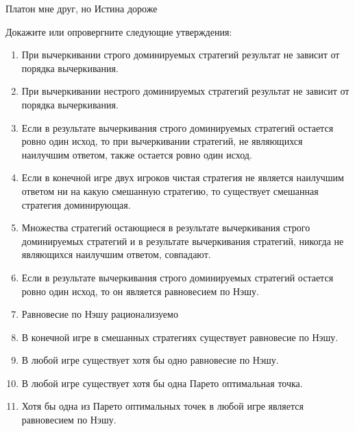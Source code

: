 \begin{problem}
 Платон мне друг, но Истина дороже\par
Докажите или опровергните следующие утверждения:\par
\begin{enumerate}
\item	При вычеркивании строго доминируемых стратегий результат не зависит от порядка вычеркивания.\par
\item 	При вычеркивании нестрого доминируемых стратегий результат не зависит от порядка вычеркивания.\par
\item 	Если в результате вычеркивания строго доминируемых стратегий остается ровно один исход, то при вычеркивании стратегий, не являющихся наилучшим ответом, также остается ровно один исход.\par
\item Если в конечной игре двух игроков чистая стратегия  не является наилучшим ответом ни на какую смешанную стратегию, то существует смешанная стратегия доминирующая.\par
\item Множества стратегий остающиеся в результате вычеркивания строго доминируемых стратегий и в результате вычеркивания стратегий, никогда не являющихся наилучшим ответом, совпадают.\par
\item Если в результате вычеркивания строго доминируемых стратегий остается ровно один исход, то он является равновесием по Нэшу.\par
\item Равновесие по Нэшу рационализуемо\par
\item В конечной игре в смешанных стратегиях существует равновесие по Нэшу.\par
\item В любой игре существует хотя бы одно равновесие по Нэшу.\par
\item В любой игре существует хотя бы одна Парето оптимальная точка.\par
\item Хотя бы одна из Парето оптимальных точек в любой игре является равновесием по Нэшу.
\end{enumerate}


\begin{sol}

\end{sol}
\end{problem}



